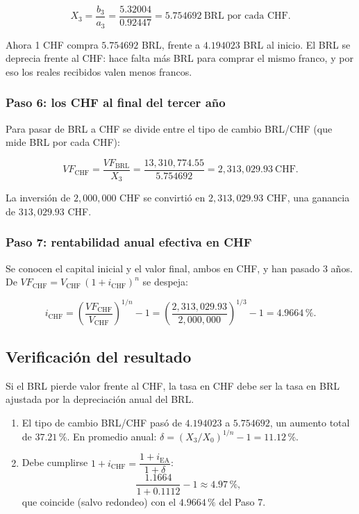 \documentclass[11pt]{article}
\newcommand{\pc}{\text{\%}}
\begin{document}
\[
X_3=\frac{b_3}{a_3}=\frac{5.32004}{0.92447}=5.754692\ \text{BRL por cada CHF.}
\]

Ahora 1 CHF compra $5.754692$ BRL, frente a $4.194023$ BRL al inicio. El BRL se deprecia frente al CHF: hace falta m\'as BRL para comprar el mismo franco, y por eso los reales recibidos valen menos francos.

\subsubsection*{Paso 6: los CHF al final del tercer a\~no}

Para pasar de BRL a CHF se divide entre el tipo de cambio BRL/CHF (que mide BRL por cada CHF):

\[
VF_{\text{CHF}}=\frac{VF_{\text{BRL}}}{X_3}
=\frac{13{,}310{,}774.55}{5.754692}=2{,}313{,}029.93\ \text{CHF.}
\]

La inversi\'on de $2{,}000{,}000$ CHF se convirti\'o en $2{,}313{,}029.93$ CHF, una ganancia de $313{,}029.93$ CHF.

\subsubsection*{Paso 7: rentabilidad anual efectiva en CHF}

Se conocen el capital inicial y el valor final, ambos en CHF, y han pasado 3 a\~nos. De $VF_{\text{CHF}}=V_{\text{CHF}}\,(1+i_{\text{CHF}})^{n}$ se despeja:

\[
i_{\text{CHF}}=\left(\frac{VF_{\text{CHF}}}{V_{\text{CHF}}}\right)^{1/n}-1
=\left(\frac{2{,}313{,}029.93}{2{,}000{,}000}\right)^{1/3}-1
=4.9664\,\pc.
\]

\subsection{Verificaci\'on del resultado}

Si el BRL pierde valor frente al CHF, la tasa en CHF debe ser la tasa en BRL ajustada por la depreciaci\'on anual del BRL.

\begin{enumerate}
\item El tipo de cambio BRL/CHF pas\'o de $4.194023$ a $5.754692$, un aumento total de $37.21\,\pc$. En promedio anual: $\delta=(X_3/X_0)^{1/n}-1=11.12\,\pc$.
\item Debe cumplirse $1+i_{\text{CHF}}=\dfrac{1+i_{\text{EA}}}{1+\delta}$:
\[
\frac{1.1664}{1+0.1112}-1\approx 4.97\,\pc,
\]
que coincide (salvo redondeo) con el $4.9664\,\pc$ del Paso 7.
\end{enumerate}
\end{document}
